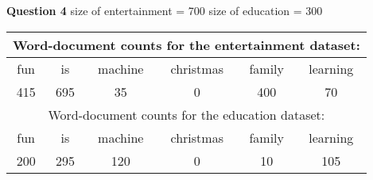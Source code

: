 \documentclass[10pt,a4paper]{article}
\begin{document}
	\newpage
	
	\textbf{Question 4} size of entertainment = 700 \hspace{1cm} size of education = 300
		\begin{table}[h!]
			\begin{tabular}{cccccc}
				\toprule
				\multicolumn{6}{c}{Word-document counts for the entertainment dataset:} \\ \midrule
				fun & is & machine & christmas & family & learning \\
				415 & 695 & 35 & 0 & 400 & 70 \\
				\midrule
				\multicolumn{6}{c}{Word-document counts for the education dataset:} \\ \midrule
				fun & is & machine & christmas & family & learning \\
				200 & 295 & 120 & 0 & 10 & 105 \\
				\bottomrule
			\end{tabular}
		\end{table}
		
\end{document}
